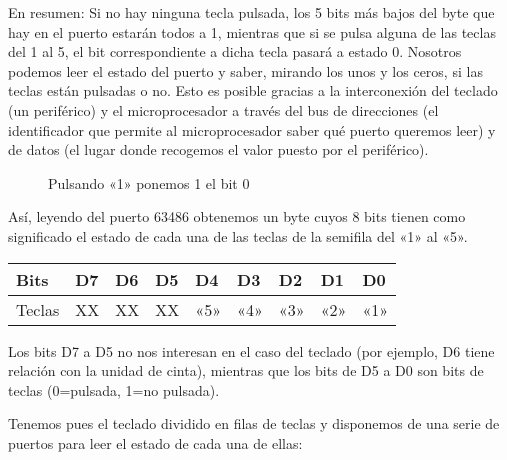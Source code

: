 \documentclass[letterpaper,10pt,spanish]{sphinxmanual}
\begin{document}
En resumen: Si no hay ninguna tecla pulsada, los 5 bits más bajos del byte que hay en el puerto estarán todos a 1, mientras que si se pulsa alguna de las teclas del 1 al 5, el bit correspondiente a dicha tecla pasará a estado 0. Nosotros podemos leer el estado del puerto y saber, mirando los unos y los ceros, si las teclas están pulsadas o no. Esto es posible gracias a la interconexión del teclado (un periférico) y el microprocesador a través del bus de direcciones (el identificador que permite al microprocesador saber qué puerto queremos leer) y de datos (el lugar donde recogemos el valor puesto por el periférico).

\begin{figure}[htbp]
\centering
\capstart

\noindent{}
\caption{Pulsando «1» ponemos 1 el bit 0}\label{\detokenize{03_arquitectura/arquitectura:id6}}\end{figure}

Así, leyendo del puerto 63486 obtenemos un byte cuyos 8 bits tienen como significado el estado de cada una de las teclas de la semifila del «1» al «5».


\begin{savenotes}\sphinxattablestart
\centering
\begin{tabulary}{\linewidth}[t]{|T|T|T|T|T|T|T|T|T|}
\hline
\sphinxstyletheadfamily 
Bits
&\sphinxstyletheadfamily 
D7
&\sphinxstyletheadfamily 
D6
&\sphinxstyletheadfamily 
D5
&\sphinxstyletheadfamily 
D4
&\sphinxstyletheadfamily 
D3
&\sphinxstyletheadfamily 
D2
&\sphinxstyletheadfamily 
D1
&\sphinxstyletheadfamily 
D0
\\
\hline
Teclas
&
XX
&
XX
&
XX
&
«5»
&
«4»
&
«3»
&
«2»
&
«1»
\\
\hline
\end{tabulary}
\par
\sphinxattableend\end{savenotes}

Los bits D7 a D5 no nos interesan en el caso del teclado (por ejemplo, D6 tiene relación con la unidad de cinta), mientras que los bits de D5 a D0 son bits de teclas (0=pulsada, 1=no pulsada).

Tenemos pues el teclado dividido en filas de teclas y disponemos de una serie de puertos para leer el estado de cada una de ellas:
\end{document}
